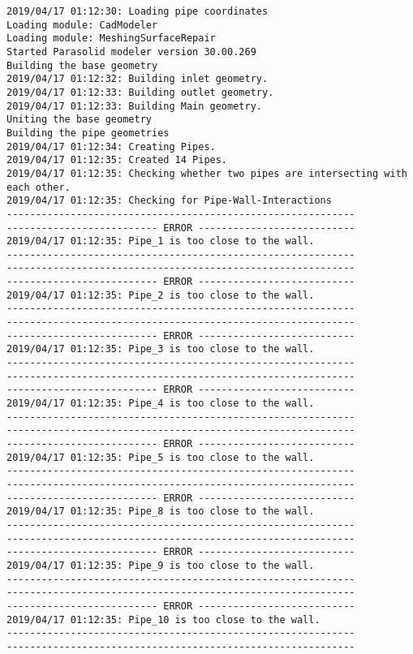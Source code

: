 \documentclass{article}
\begin{document}
{\tiny 
\begin{verbatim}
2019/04/17 01:12:30: Loading pipe coordinates
Loading module: CadModeler
Loading module: MeshingSurfaceRepair
Started Parasolid modeler version 30.00.269
Building the base geometry
2019/04/17 01:12:32: Building inlet geometry.
2019/04/17 01:12:33: Building outlet geometry.
2019/04/17 01:12:33: Building Main geometry.
Uniting the base geometry
Building the pipe geometries
2019/04/17 01:12:34: Creating Pipes.
2019/04/17 01:12:35: Created 14 Pipes.
2019/04/17 01:12:35: Checking whether two pipes are intersecting with each other.
2019/04/17 01:12:35: Checking for Pipe-Wall-Interactions
------------------------------------------------------------
-------------------------- ERROR ---------------------------
2019/04/17 01:12:35: Pipe_1 is too close to the wall.
------------------------------------------------------------
------------------------------------------------------------
-------------------------- ERROR ---------------------------
2019/04/17 01:12:35: Pipe_2 is too close to the wall.
------------------------------------------------------------
------------------------------------------------------------
-------------------------- ERROR ---------------------------
2019/04/17 01:12:35: Pipe_3 is too close to the wall.
------------------------------------------------------------
------------------------------------------------------------
-------------------------- ERROR ---------------------------
2019/04/17 01:12:35: Pipe_4 is too close to the wall.
------------------------------------------------------------
------------------------------------------------------------
-------------------------- ERROR ---------------------------
2019/04/17 01:12:35: Pipe_5 is too close to the wall.
------------------------------------------------------------
------------------------------------------------------------
-------------------------- ERROR ---------------------------
2019/04/17 01:12:35: Pipe_8 is too close to the wall.
------------------------------------------------------------
------------------------------------------------------------
-------------------------- ERROR ---------------------------
2019/04/17 01:12:35: Pipe_9 is too close to the wall.
------------------------------------------------------------
------------------------------------------------------------
-------------------------- ERROR ---------------------------
2019/04/17 01:12:35: Pipe_10 is too close to the wall.
------------------------------------------------------------
------------------------------------------------------------

\end{verbatim}}
\end{document}
